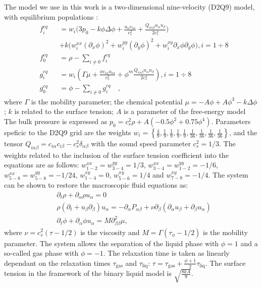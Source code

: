 \documentclass{article}
\begin{document}
The model we use in this work is a two-dimensional nine-velocity (D2Q9) model,
with equilibrium populations \cite{pooley-contact}:
\begin{equation}
\begin{aligned}
&f_i^{eq}&&=w_i 
\biggl(3
p_0 - k \phi \Delta \phi
+\frac{u_{\alpha}c_{i\alpha}}{c_s^2}+\frac{Q_{i\alpha\beta}u_{\alpha } u_ {
\beta}}{2 c_s^4}\biggr)\\
&&&+k\bigl(w_i^{xx} (\partial_x \phi)^2+w_i^{yy} (\partial_y \phi)^2 +w_i^{xy} \partial_x
\phi \partial_y \phi \bigr), i=1\div8\\
&f_0^{eq}&&=\rho-\sum_{i\neq0}{f_i^{eq}}\\
&g_i^{eq}&&=w_i\left(\Gamma \mu + \frac{\phi c_{i\alpha} u_{i\alpha}}{c_s^2}+\phi^m
\frac{Q_{i\alpha\beta}u_{\alpha}u_{\beta}}{2 c_s^4}\right), i=1\div8 \\
&g_0^{eq}&&=\phi-\sum_{i\neq0}{g_i^{eq}}\quad,
\end{aligned}
\end{equation}
where $\Gamma$ is the mobility parameter; the chemical potential
$\mu=-A\phi+A\phi^3-k\Delta\phi$; $k$ is related to the surface
tension; $A$ is a parameter of the free-energy model  The bulk pressure
is expressed as $p_0=c_s^2 \rho +A (-0.5 \phi^2+0.75 \phi^4)$. 
Parameters speficic to the D2Q9 grid are the weights
$w_i=\left\{\frac{4}{9},\frac{1}{9},\frac{1}{9},\frac{1}{9},\frac{1}{9},
\frac{1}{36},\frac{1}{36},\frac{1}{36},\frac{1}{36}\right\}$, and the tensor
$Q_{i\alpha\beta}=c_{i\alpha} c_{i\beta} - c_s^2 \delta_{\alpha\beta}$ with
the sound speed parameter $c_s^2=1/3$.  The weights related to the
inclusion of the surface tension coefficient into the equations are as follows:
$w^{xx}_{1-2}=w^{yy}_{3-4}=1/3$, $w^{xx}_{3-4}=w^{yy}_{1-2}=-1/6$,
$w^{xx}_{5-8}=w^{yy}_{5-8}=-1/24$, $w^{xy}_{1-4}=0$, $w^{xy}_{5-6}=1/4$ and
$w^{xy}_{7-8}=-1/4$. The system can be shown to restore the macroscopic
fluid equations as:
\begin{equation}
\begin{aligned}
&\partial_t \rho+ \partial_{\alpha} \rho u_{\alpha}=0\\
&\rho\left(\partial_t+u_{\beta}\partial_{\beta}\right) u_{\alpha}=
-\partial_{\alpha}P_{\alpha \beta} +
\nu\partial_{\beta}\left(\partial_{\alpha}u_{\beta}+\partial_{\beta} u_{\alpha}\right)\\
&\partial_t \phi + \partial_{\alpha} \phi u_{\alpha}=M \partial^2_{\beta\beta} \mu,
\end{aligned}
\label{binary:fluid:system}
\end{equation}
where $\nu=c_s^2 (\tau-1/2)$ is the viscosity and
$M=\Gamma(\tau_{\phi}-1/2)$ is the mobility parameter. The system allows the separation of the liquid
phase with $\phi=1$ and a so-called gas phase with $\phi=-1$. The
relaxation time is taken as linearly dependant on the relaxation
times $\tau_{\mathrm{gas}}$ and $\tau_{\mathrm{liq}}$:
$\tau=\tau_{\mathrm{gas}}+\frac{\phi+1}{2}\tau_{\mathrm{liq}}$.
The surface tension in the framework of the binary liquid model is $\sqrt{\frac{8 k A}{9}}$.
\end{document}
